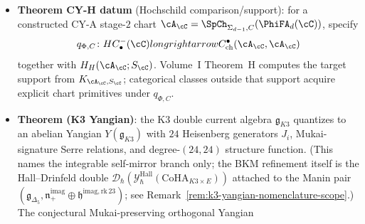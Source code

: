 \begin{itemize}[leftmargin=1.5em,topsep=0.3ex,itemsep=0.5ex]
 directly off the stage-1 datum $\PhiFA_d(\Perf(X))$ through
 the Gerstenhaber $(1 - d)$-bracket and the HKR identification.
 The identity is stage-1 and does not depend on the stage-2
 specialisation $(\Sigma_{d-1}, C)$: any two shadows of the
 same $\PhiFA_d(\cC_X)$ share $\kappa_{\mathrm{ch}}$. At
 $d = 2$: $\kappa_{\mathrm{ch}}(\Phi_2(\cC)) = \chi^{\CY}(\cC)$
 coincides with the CY Euler characteristic via Serre duality
 $S_\cC = [2]$ (proved,
	 Proposition~\ref{prop:cy-kappa-d2}). For $K3 \times E$
	($d = 3$), the framed specialisation
	 $\Phi_3^{(K3,E)}$ constructs $\cA_{K3 \times E}^{(K3,E)}$, and the
 Borcherds weight gives the distinct stage-2 invariant
 $\kappa_{\mathrm{BKM}}(\Delta_5) = 5$; the Künneth-additive Heisenberg
 convention gives $\kappa_{\mathrm{ch}}^{\mathrm{Heis}}(K3 \times
 E) = 3$, distinct from the Hodge-supertrace
 $\kappa_{\mathrm{ch}}^{\mathrm{Hodge}}(K3 \times E) = 0$ (odd
 $d$: Serre pairing $h^{0, q} = h^{0, d - q}$ forces
 $\chi(\cO) = 0$). Thus the Hodge and Heisenberg chiral readings are
 already two different entries of the \(\kappa_\bullet\)-spectrum. Any
 further chiral scalar
 \(\kappa_{\mathrm{ch}}^\rho(\cA_{K3 \times E})\), beyond the named
 Hodge and Heisenberg readings, requires its own construction; the
 general $d = 3$ formula is conjectural
 (Theorem~\ref{thm:kappa-stratification-by-d}).
 \item \textbf{Theorem CY-H datum} (Hochschild comparison/support):
 \label{thm:cy-h-dependency-graph}
 for a constructed CY-A stage-$2$ chart
 $\cA_\cC=\SpCh_{\Sigma_{d-1},C}(\PhiFA_d(\cC))$, specify
 \[
 q_{\Phi,C}\colon HC^-_\bullet(\cC)longrightarrow
 C^\bullet_{\mathrm{ch}}(\cA_\cC,\cA_\cC)
 \]
 together with $H_H(\cA_\cC;S_\cC)$.  Volume~I Theorem~H computes
 the target support from $K_{\cA_\cC,S_\cC}$; categorical classes
 outside that support acquire explicit chart primitives under
 $q_{\Phi,C}$.
 \item \textbf{Theorem (K3 Yangian)}: the K3 double current
 algebra $\mathfrak{g}_{K3}$ quantizes to an abelian Yangian
 $Y(\mathfrak{g}_{K3})$ with $24$ Heisenberg generators
 $J_i$, Mukai-signature Serre relations, and degree-$(24, 24)$
 structure function. (This names the integrable self-mirror
 branch only; the BKM refinement itself is
 the Hall--Drinfeld double
 $\mathcal{D}_\hbar(\mathcal{Y}^{\mathrm{Hall}}_\hbar
 (\mathrm{CoHA}_{K3\times E}))$ attached to the Manin pair
 $(\mathfrak{g}_{\Delta_5},
 \mathfrak{n}_+^{\mathrm{imag}}\oplus
 \mathfrak{h}^{\mathrm{imag,rk\,23}})$; see
 Remark~\ref{rem:k3-yangian-nomenclature-scope}.) The
 conjectural Mukai-preserving orthogonal Yangian

\end{itemize}
